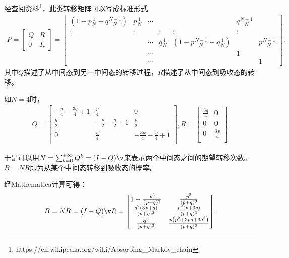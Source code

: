 经查阅资料\footnote{https://en.wikipedia.org/wiki/Absorbing\_Markov\_chain}，此类转移矩阵可以写成标准形式
\begin{align*}
    P = 
    \begin{bmatrix} 
        Q & R \\ 0 & I_r
    \end{bmatrix} = 
    \begin{bmatrix} 
        (1 - p \frac{1}{N} - q \frac{N-1}{N}) & p \frac{1}{N} & \cdots & & & q \frac{N-1}{N} & \\
        \vdots & \vdots & & \vdots & \vdots & \vdots\\
               & &\cdots  & q \frac{1}{N} & (1 - p \frac{N-1}{N} - q \frac{1}{N}) & &  p \frac{N-1}{N} \\
               & & \cdots & & & 1 & \\
         & & \cdots & & & & 1
    \end{bmatrix} 
.\end{align*}
其中$Q$描述了从中间态到另一中间态的转移过程，$R$描述了从中间态到吸收态的转移。

如$N=4$时，
\begin{align*}
    Q = 
    \begin{bmatrix} 
         -\frac{p}{4}-\frac{3 q}{4}+1 & \frac{p}{4} & 0 \\
         \frac{q}{2} & -\frac{p}{2}-\frac{q}{2}+1 & \frac{p}{2} \\
         0 & \frac{q}{4} & -\frac{3 p}{4}-\frac{q}{4}+1 \\
    \end{bmatrix} ,
    R = 
    \begin{bmatrix} 
         \frac{3 q}{4} & 0 \\
         0 & 0 \\
         0 & \frac{3 p}{4} \\
    \end{bmatrix} 
.\end{align*}

于是可以用$N = \sum_{k=0}^{+\infty} Q^k = (I-Q)\v$来表示两个中间态之间的期望转移次数。$B = NR$即为从某个中间态转移到吸收态的概率。

经Mathematica计算可得：
\begin{align*}
    B = NR = (I - Q)\v R = 
    \begin{bmatrix} 
         1-\frac{p^3}{(p+q)^3} & \frac{p^3}{(p+q)^3} \\
         \frac{q^2 (3 p+q)}{(p+q)^3} & \frac{p^2 (p+3 q)}{(p+q)^3} \\
         \frac{q^3}{(p+q)^3} & \frac{p \left(p^2+3 p q+3 q^2\right)}{(p+q)^3} \\
    \end{bmatrix} 
.\end{align*}

